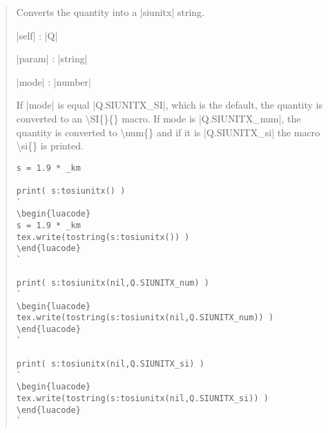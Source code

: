 \documentclass{ltxdoc}
\begin{document}
\begin{quote}
  Converts the quantity into a |siunitx| string.

  \begin{description}
  \item |self| : |Q|

  \item |param| : |string|

  \item |mode| : |number|
  \end{description}

  If |mode| is equal |Q.SIUNITX_SI|, which is the default, the quantity is converted to an \textbackslash SI\{\}\{\} macro. If mode is |Q.SIUNITX_num|, the quantity is converted to \textbackslash num\{\} and if it is |Q.SIUNITX_si| the macro \textbackslash si\{\} is printed.

\begin{lstlisting}
s = 1.9 * _km

print( s:tosiunitx() )
`
\begin{luacode}
s = 1.9 * _km
tex.write(tostring(s:tosiunitx()) )
\end{luacode}
`

print( s:tosiunitx(nil,Q.SIUNITX_num) )
`
\begin{luacode}
tex.write(tostring(s:tosiunitx(nil,Q.SIUNITX_num)) )
\end{luacode}
`

print( s:tosiunitx(nil,Q.SIUNITX_si) )
`
\begin{luacode}
tex.write(tostring(s:tosiunitx(nil,Q.SIUNITX_si)) )
\end{luacode}
`
\end{lstlisting}

\end{quote}
\end{document}
